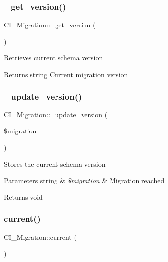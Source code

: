 \subsubsection{\texorpdfstring{\+\_\+get\+\_\+version()}{\_get\_version()}}
{\footnotesize\ttfamily C\+I\+\_\+\+Migration\+::\+\_\+get\+\_\+version (\begin{DoxyParamCaption}{ }\end{DoxyParamCaption})\hspace{0.3cm}{\ttfamily [protected]}}

Retrieves current schema version

\begin{DoxyReturn}{Returns}
string Current migration version 
\end{DoxyReturn}
\mbox{\label{class_c_i___migration_a3ebdc31b25f9ad46c1fcee70a8e15afe}} 
\subsubsection{\texorpdfstring{\+\_\+update\+\_\+version()}{\_update\_version()}}
{\footnotesize\ttfamily C\+I\+\_\+\+Migration\+::\+\_\+update\+\_\+version (\begin{DoxyParamCaption}\item[{}]{\$migration }\end{DoxyParamCaption})\hspace{0.3cm}{\ttfamily [protected]}}

Stores the current schema version


\begin{DoxyParams}[1]{Parameters}
string & {\em \$migration} & Migration reached \\
\hline
\end{DoxyParams}
\begin{DoxyReturn}{Returns}
void 
\end{DoxyReturn}
\mbox{\label{class_c_i___migration_ad901ca17e76bb5273bac143321c01201}} 
\subsubsection{\texorpdfstring{current()}{current()}}
{\footnotesize\ttfamily C\+I\+\_\+\+Migration\+::current (\begin{DoxyParamCaption}{ }\end{DoxyParamCaption})}

